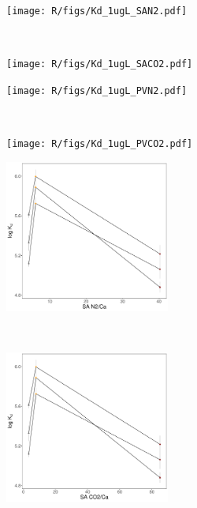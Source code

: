 \begin{figure}[t!]
    \centering
    \begin{subfigure}[t]{0.5\textwidth}
        \centering
        \texttt{[image: R/figs/Kd\_1ugL\_SAN2.pdf]}
        \caption{}
        \label{subfig:SAN2}
    \end{subfigure}%
    ~ 
    \begin{subfigure}[t]{0.5\textwidth}
        \centering
        \texttt{[image: R/figs/Kd\_1ugL\_SACO2.pdf]}
        \caption{}
        \label{subfig:SACO2}
    \end{subfigure}
    \medskip
    \begin{subfigure}[t]{0.5\textwidth}
        \centering
        \texttt{[image: R/figs/Kd\_1ugL\_PVN2.pdf]}
        \caption{}
        \label{subfig:PVN2}
    \end{subfigure}%
    ~ 
    \begin{subfigure}[t]{0.5\textwidth}
        \centering
        \texttt{[image: R/figs/Kd\_1ugL\_PVCO2.pdf]}
        \caption{}
        \label{subfig:PVCO2}
    \end{subfigure}
    \medskip
    \begin{subfigure}[t]{0.5\textwidth}
        \centering
        \includegraphics[height=5cm]{R/figs/Kd_1ugL_SAN2_Ca.pdf}
        \caption{}
        \label{subfig:SAN2_Ca}
    \end{subfigure}%
    ~ 
    \begin{subfigure}[t]{0.5\textwidth}
        \centering
        \includegraphics[height=5cm]{R/figs/Kd_1ugL_SACO2_Ca.pdf}

\end{subfigure}
\end{figure}
